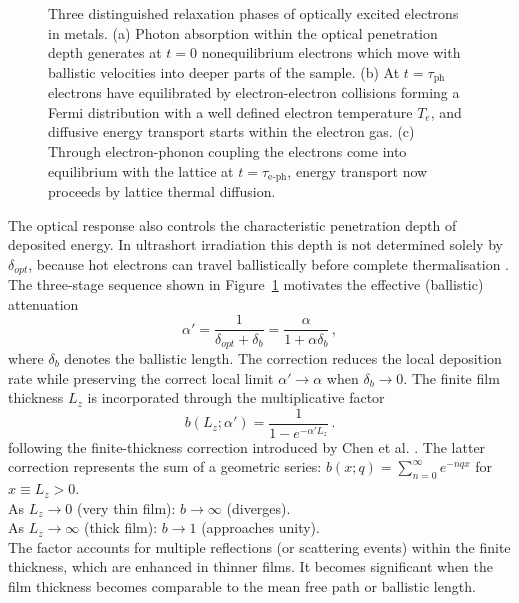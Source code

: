
\begin{figure}[htbp]
  \centering
  \PublicFigureOmitted[0.60\linewidth]
  \caption{Three distinguished relaxation phases of optically excited electrons in metals.
    (a) Photon absorption within the optical penetration depth generates at $t=0$ nonequilibrium electrons which move with ballistic velocities into deeper parts of the sample.
    (b) At $t = \tau_\text{ph}$ electrons have equilibrated by electron-electron collisions forming a Fermi distribution with a well defined electron temperature $T_e$, and diffusive energy transport starts within the electron gas.
    (c) Through electron-phonon coupling the electrons come into equilibrium with the lattice at $t = \tau_\text{e-ph}$, energy transport now proceeds by lattice thermal diffusion. \cite{Hohlfeld_2000}}
  \label{fig:ch1-ballistic-electrons}
\end{figure}

The optical response also controls the characteristic penetration depth of deposited energy. In ultrashort irradiation this depth is not determined solely by \(\delta_{opt}\), because hot electrons can travel ballistically before complete thermalisation \cite{Hohlfeld_2000, Zhang_2015}.
The three-stage sequence shown in Figure~\ref{fig:ch1-ballistic-electrons} motivates the effective (ballistic) attenuation
\begin{equation}
  \alpha' = \frac{1}{\delta_{opt} + \delta_b} = \frac{\alpha}{1 + \alpha \delta_b} \, ,
  \label{eq:ch1-alpha-prime}
\end{equation}
where \(\delta_b\) denotes the ballistic length. The correction reduces the local deposition rate while preserving the correct local limit \(\alpha' \to \alpha\) when \(\delta_b \to 0\).
The finite film thickness \(L_z\) is incorporated through the multiplicative factor
\begin{equation}
  b(L_z;\alpha') = \frac{1}{1 - e^{-\alpha' L_z}} \, .
  \label{eq:ch1-thickness-factor}
\end{equation}
following the finite-thickness correction introduced by Chen et al. \cite{Chen_2001}.
The latter correction represents the sum of a geometric series:
$b(x; q) = \sum_{n=0}^{\infty} e^{-nqx}$ for $x \equiv L_z > 0$.\\
\noindent As $L_z \to 0$ (very thin film): $b \to \infty$ (diverges).\\
\noindent As $L_z \to \infty$ (thick film): $b \to 1$ (approaches unity).\\
\noindent The factor accounts for multiple reflections (or scattering events) within the finite thickness, which are enhanced in thinner films.
It becomes significant when the film thickness becomes comparable to the mean free path or ballistic length.

